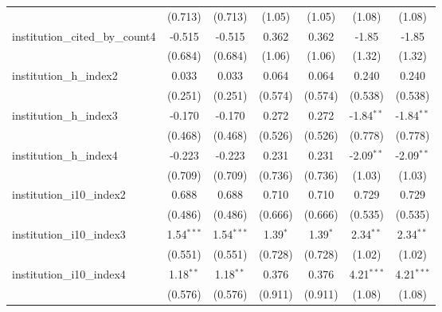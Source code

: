 \begin{tabular}{lcccccc}
                                         & (0.713)       & (0.713)       & (1.05)        & (1.05)        & (1.08)        & (1.08)\\   
   institution\_cited\_by\_count4        & -0.515        & -0.515        & 0.362         & 0.362         & -1.85         & -1.85\\   
                                         & (0.684)       & (0.684)       & (1.06)        & (1.06)        & (1.32)        & (1.32)\\   
   institution\_h\_index2                & 0.033         & 0.033         & 0.064         & 0.064         & 0.240         & 0.240\\   
                                         & (0.251)       & (0.251)       & (0.574)       & (0.574)       & (0.538)       & (0.538)\\   
   institution\_h\_index3                & -0.170        & -0.170        & 0.272         & 0.272         & -1.84$^{**}$  & -1.84$^{**}$\\   
                                         & (0.468)       & (0.468)       & (0.526)       & (0.526)       & (0.778)       & (0.778)\\   
   institution\_h\_index4                & -0.223        & -0.223        & 0.231         & 0.231         & -2.09$^{**}$  & -2.09$^{**}$\\   
                                         & (0.709)       & (0.709)       & (0.736)       & (0.736)       & (1.03)        & (1.03)\\   
   institution\_i10\_index2              & 0.688         & 0.688         & 0.710         & 0.710         & 0.729         & 0.729\\   
                                         & (0.486)       & (0.486)       & (0.666)       & (0.666)       & (0.535)       & (0.535)\\   
   institution\_i10\_index3              & 1.54$^{***}$  & 1.54$^{***}$  & 1.39$^{*}$    & 1.39$^{*}$    & 2.34$^{**}$   & 2.34$^{**}$\\   
                                         & (0.551)       & (0.551)       & (0.728)       & (0.728)       & (1.02)        & (1.02)\\   
   institution\_i10\_index4              & 1.18$^{**}$   & 1.18$^{**}$   & 0.376         & 0.376         & 4.21$^{***}$  & 4.21$^{***}$\\   
                                         & (0.576)       & (0.576)       & (0.911)       & (0.911)       & (1.08)        & (1.08)\\   

\end{tabular}
